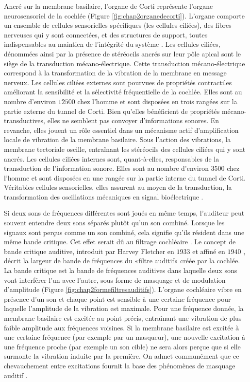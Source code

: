 Ancré sur la membrane basilaire, l’organe de Corti représente l’organe neurosensoriel de la cochlée (Figure \ref{fig:chap2organedecorti}). 
L'organe comporte un ensemble de cellules sensorielles spécifiques (les cellules ciliées), des fibres nerveuses qui y sont connectées, et des structures de support, toutes indispensables au maintien de l’intégrité du système \citep{hasselmann2017codage, lorenzi2016audition}. 
Les cellules ciliées, dénommées ainsi par la présence de stéréocils ancrés sur leur pôle apical sont le siège de la transduction mécano-électrique. 
Cette transduction mécano-électrique correspond à la transformation de la vibration de la membrane en message nerveux. 
Les cellules ciliées externes sont pourvues de propriétés contractiles améliorant la sensibilité et la sélectivité fréquentielle de la cochlée.
Elles sont au nombre d'environ $12500$ chez l’homme et sont disposées en trois rangées sur la partie externe du tunnel de Corti. 
Bien qu’elles bénéficient de propriétés mécano-transductives, elles ne semblent pas convoyer d’informations sonores. 
En revanche, elles jouent un rôle essentiel dans un mécanisme actif d'amplification locale de vibration de la membrane basilaire. 
Sous l’action des vibrations, la membrane tectoriale oscille, entraînant les stéréocils des cellules ciliées qui y sont ancrés. 
Les cellules ciliées internes sont, quant-à-elles, responsables de la transduction de l'information sonore. 
Elles sont au nombre d'environ $3500$ chez l’homme et sont disposées en une rangée sur la partie interne du tunnel de Corti. 
Véritables cellules sensorielles, elles assurent au moyen de la transduction, la transformation des oscillations mécaniques en signal bioélectrique \citep{albouy2013behavioral}. 

Si deux sons de fréquences différentes sont joués en même temps, l'auditeur peut souvent entendre deux sons séparés plutôt qu'un son combiné. 
Lorsque les signaux sont perçus comme un son combiné, cela signifie qu'ils résident dans une même bande critique.
Cet effet serait dû au filtrage cochléaire \citep{moore1995hearing, moore2012auditory, moore2012introduction}. 
Le concept de bande critique auditive, introduit par Harvey Fletcher en $1933$ \citep{fletcher1933loudness} et affiné en $1940$ \citep{fletcher1940auditory}, décrit la largeur de bande de fréquences du «filtre auditif» créée par la cochlée. 
La bande critique est la bande de fréquences auditives dans laquelle deux sons vont interférer l'un avec l'autre, sous forme de masquage et de modulation d'amplitude (Figure \ref{fig:chap2formefiltresauditifs}). 
L'organe cochléaire vibre en présence d’un son et chaque point est sensible à une certaine fréquence pour laquelle l’amplitude de la vibration est maximale. 
Pour une fréquence donnée, la membrane basilaire est excitée au point précis, entraînant une vibration de plus faible amplitude aux fréquences voisines. 
Si la membrane basilaire est excitée à une certaine fréquence (par exemple par un masqueur), une nouvelle excitation à une fréquence proche (par exemple un son cible) ne sera alors perçue que si elle surmonte la vibration induite par la première. 
On admet communément que ce chevauchement entre excitations fournit la base des phénomènes de masquage auditif \citep{moore2012auditory, moore2012introduction}. 

